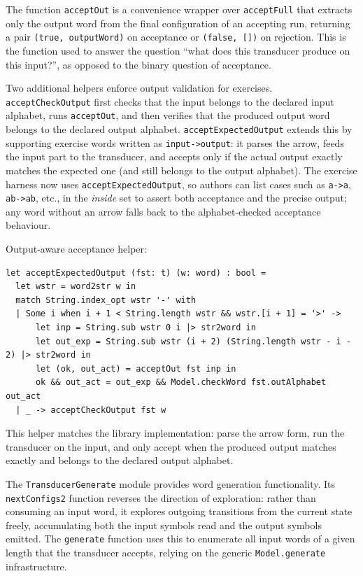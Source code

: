 The function \texttt{acceptOut} is a convenience wrapper over \texttt{acceptFull} that extracts only the output word from 
the final configuration of an accepting run, returning a pair \texttt{(true, outputWord)} on acceptance or \texttt{(false, [])} 
on rejection. This is the function used to answer the question ``what does this transducer produce on this input?'', 
as opposed to the binary question of acceptance.

Two additional helpers enforce output validation for exercises. \texttt{acceptCheckOutput} first checks that the input belongs to
the declared input alphabet, runs \texttt{acceptOut}, and then verifies that the produced output word belongs to the declared
output alphabet. \texttt{acceptExpectedOutput} extends this by supporting exercise words written as \texttt{input->output}:
it parses the arrow, feeds the input part to the transducer, and accepts only if the actual output exactly matches the expected
one (and still belongs to the output alphabet). The exercise harness now uses \texttt{acceptExpectedOutput}, so authors can list
cases such as \texttt{a->a}, \texttt{ab->ab}, etc., in the \emph{inside} set to assert both acceptance and the precise output; any
word without an arrow falls back to the alphabet-checked acceptance behaviour.

Output-aware acceptance helper:
\begin{verbatim}
let acceptExpectedOutput (fst: t) (w: word) : bool =
  let wstr = word2str w in
  match String.index_opt wstr '-' with
  | Some i when i + 1 < String.length wstr && wstr.[i + 1] = '>' ->
      let inp = String.sub wstr 0 i |> str2word in
      let out_exp = String.sub wstr (i + 2) (String.length wstr - i - 2) |> str2word in
      let (ok, out_act) = acceptOut fst inp in
      ok && out_act = out_exp && Model.checkWord fst.outAlphabet out_act
  | _ -> acceptCheckOutput fst w
\end{verbatim}
This helper matches the library implementation: parse the arrow form, run the transducer on the input, 
and only accept when the produced output matches exactly and belongs to the declared output alphabet.

The \texttt{TransducerGenerate} module provides word generation functionality. Its \texttt{nextConfigs2} 
function reverses the direction of exploration: rather than consuming an input word, it explores outgoing 
transitions from the current state freely, accumulating both the input symbols read and the output symbols emitted. 
The \texttt{generate} function uses this to enumerate all input words of a given length that the transducer accepts, 
relying on the generic \texttt{Model.generate} infrastructure.

